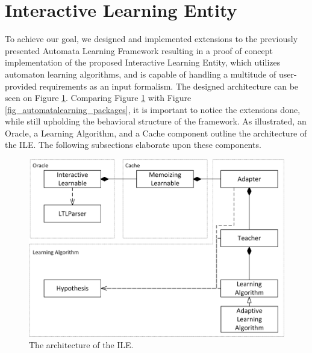 \smallskip

\section{Interactive Learning Entity} \label{sec_interactivelearningframework}

To achieve our goal, we designed and implemented extensions to the previously presented Automata Learning Framework resulting in a proof of concept implementation of the proposed Interactive Learning Entity, which utilizes automaton learning algorithms, and is capable of handling a multitude of user-provided requirements as an input formalism. The designed architecture can be seen on Figure \ref{fig_automatonlearning_overview}. Comparing Figure \ref{fig_automatonlearning_overview} with Figure \ref{fig_automatalearning_packages}, it is important to notice the extensions done, while still upholding the behavioral structure of the framework. As illustrated, an Oracle, a Learning Algorithm, and a Cache component outline the architecture of the ILE. The following subsections elaborate upon these components.

\begin{figure}[!ht] 
	\centering
	\includegraphics[width=120mm, keepaspectratio]{figures/automatalearning_overview.png}
	\caption{The architecture of the ILE.} 
	\label{fig_automatonlearning_overview}
\end{figure}

